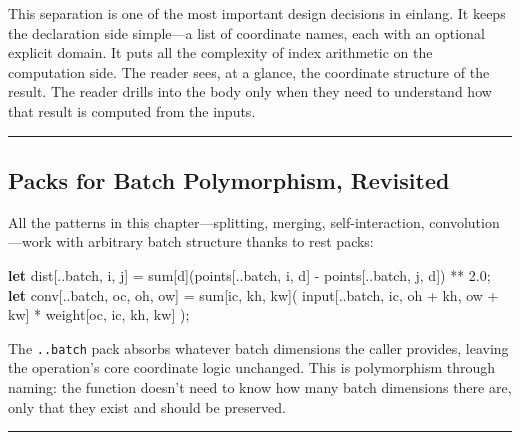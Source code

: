 \documentclass[11pt,]{article}
\newenvironment{Shaded}{}{}
\newcommand{\DecValTok}[1]{\textcolor[rgb]{0.25,0.63,0.44}{#1}}
\newcommand{\KeywordTok}[1]{\textcolor[rgb]{0.00,0.44,0.13}{\textbf{#1}}}
\newcommand{\NormalTok}[1]{#1}
\newcommand{\OperatorTok}[1]{\textcolor[rgb]{0.40,0.40,0.40}{#1}}
\begin{document}
This separation is one of the most important design decisions in
einlang. It keeps the declaration side simple---a list of coordinate
names, each with an optional explicit domain. It puts all the complexity
of index arithmetic on the computation side. The reader sees, at a
glance, the coordinate structure of the result. The reader drills into
the body only when they need to understand how that result is computed
from the inputs.

\begin{center}\rule{0.5\linewidth}{0.4pt}\end{center}

\hypertarget{packs-for-batch-polymorphism-revisited}{%
\subsection{Packs for Batch Polymorphism,
Revisited}\label{packs-for-batch-polymorphism-revisited}}

All the patterns in this chapter---splitting, merging, self-interaction,
convolution---work with arbitrary batch structure thanks to rest packs:

\begin{Shaded}
\begin{Highlighting}[]
\KeywordTok{let}\NormalTok{ dist}\OperatorTok{[}\NormalTok{..batch, i, j}\OperatorTok{]}\NormalTok{ = sum}\OperatorTok{[}\NormalTok{d}\OperatorTok{]}\NormalTok{(points}\OperatorTok{[}\NormalTok{..batch, i, d}\OperatorTok{]}\NormalTok{ - points}\OperatorTok{[}\NormalTok{..batch, j, d}\OperatorTok{]}\NormalTok{) ** }\DecValTok{2.0}\NormalTok{;}
\KeywordTok{let}\NormalTok{ conv}\OperatorTok{[}\NormalTok{..batch, oc, oh, ow}\OperatorTok{]}\NormalTok{ = sum}\OperatorTok{[}\NormalTok{ic, kh, kw}\OperatorTok{]}\NormalTok{(}
\NormalTok{    input}\OperatorTok{[}\NormalTok{..batch, ic, oh + kh, ow + kw}\OperatorTok{]}\NormalTok{ * weight}\OperatorTok{[}\NormalTok{oc, ic, kh, kw}\OperatorTok{]}
\NormalTok{);}
\end{Highlighting}
\end{Shaded}

The \texttt{..batch} pack absorbs whatever batch dimensions the caller
provides, leaving the operation's core coordinate logic unchanged. This
is polymorphism through naming: the function doesn't need to know how
many batch dimensions there are, only that they exist and should be
preserved.

\begin{center}\rule{0.5\linewidth}{0.4pt}\end{center}
\end{document}
